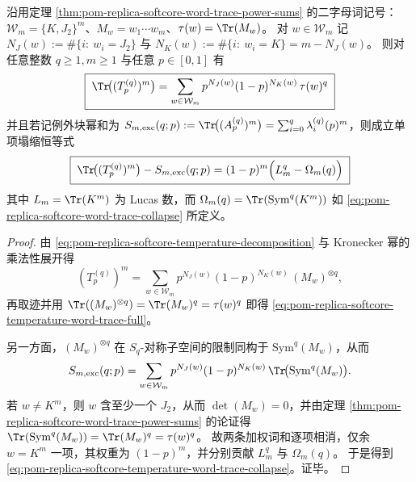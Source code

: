 \begin{theorem}[温度延拓下的词迹公式与固定谱簇单项塌缩]\label{thm:pom-replica-softcore-temperature-word-trace-collapse}
沿用定理 \ref{thm:pom-replica-softcore-word-trace-power-sums} 的二字母词记号：\(\mathcal{W}_m=\{K,J_2\}^m\)、\(M_w=w_1\cdots w_m\)、\(\tau(w)=\Tr(M_w)\)。
对 \(w\in\mathcal{W}_m\) 记
\(
N_J(w):=\#\{i:\ w_i=J_2\}
\) 与 \(N_K(w):=\#\{i:\ w_i=K\}=m-N_J(w)\)。
则对任意整数 \(q\ge 1,m\ge 1\) 与任意 \(p\in[0,1]\) 有
\begin{equation}\label{eq:pom-replica-softcore-temperature-word-trace-full}
\boxed{\;
\Tr\!\bigl((T_p^{(q)})^{m}\bigr)
=\sum_{w\in\mathcal{W}_m}p^{N_J(w)}(1-p)^{N_K(w)}\,\tau(w)^{q}\;}
\end{equation}
并且若记例外块幂和为
\(
S_{m,\mathrm{exc}}(q;p):=\Tr\!\bigl((A_p^{(q)})^{m}\bigr)=\sum_{i=0}^{q}\lambda_i^{(q)}(p)^{m}
\)，则成立单项塌缩恒等式
\begin{equation}\label{eq:pom-replica-softcore-temperature-word-trace-collapse}
\boxed{\;
\Tr\!\bigl((T_p^{(q)})^{m}\bigr)-S_{m,\mathrm{exc}}(q;p)
=(1-p)^{m}\Bigl(L_m^{q}-\Omega_m(q)\Bigr)\;}
\end{equation}
其中 \(L_m=\Tr(K^m)\) 为 Lucas 数，而 \(\Omega_m(q)=\Tr(\mathrm{Sym}^q(K^m))\) 如 \eqref{eq:pom-replica-softcore-word-trace-collapse} 所定义。
\end{theorem}
\begin{proof}
由 \eqref{eq:pom-replica-softcore-temperature-decomposition} 与 Kronecker 幂的乘法性展开得
\[
(T_p^{(q)})^m
=\sum_{w\in\mathcal{W}_m}p^{N_J(w)}(1-p)^{N_K(w)}\,(M_w)^{\otimes q},
\]
再取迹并用 \(\Tr((M_w)^{\otimes q})=\Tr(M_w)^q=\tau(w)^q\) 即得 \eqref{eq:pom-replica-softcore-temperature-word-trace-full}。
\par
另一方面，\((M_w)^{\otimes q}\) 在 \(S_q\)-对称子空间的限制同构于 \(\mathrm{Sym}^q(M_w)\)，从而
\[
S_{m,\mathrm{exc}}(q;p)
=\sum_{w\in\mathcal{W}_m}p^{N_J(w)}(1-p)^{N_K(w)}\,\Tr\!\bigl(\mathrm{Sym}^q(M_w)\bigr).
\]
若 \(w\neq K^m\)，则 \(w\) 含至少一个 \(J_2\)，从而 \(\det(M_w)=0\)，并由定理 \ref{thm:pom-replica-softcore-word-trace-power-sums} 的论证得
\(
\Tr(\mathrm{Sym}^q(M_w))=\Tr(M_w)^q=\tau(w)^q
\)。
故两条加权词和逐项相消，仅余 \(w=K^m\) 一项，其权重为 \((1-p)^m\)，并分别贡献 \(L_m^q\) 与 \(\Omega_m(q)\)。
于是得到 \eqref{eq:pom-replica-softcore-temperature-word-trace-collapse}。证毕。
\end{proof}

\endinput

